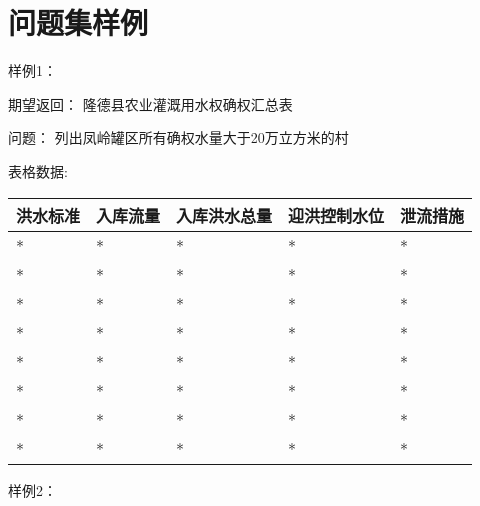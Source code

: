 \chapter{问题集样例}
\label{cha:问题集样例}



样例1：

期望返回： 
隆德县农业灌溉用水权确权汇总表

问题：
列出凤岭罐区所有确权水量大于20万立方米的村

表格数据:

\begin{table}[htbp]
    \centering
    \begin{tabular}{lllll}
    \toprule
    \textbf{洪水标准} & \textbf{入库流量} & \textbf{入库洪水总量} & \textbf{迎洪控制水位} & \textbf{泄流措施} \\
    \midrule
    * & * & * & * & * \\
    * & * & * & * & * \\
    * & * & * & * & * \\
    * & * & * & * & * \\
    * & * & * & * & * \\
    * & * & * & * & * \\
    * & * & * & * & * \\
    * & * & * & * & * \\
    \bottomrule
    \end{tabular}
\end{table}
\newpage
样例2：

